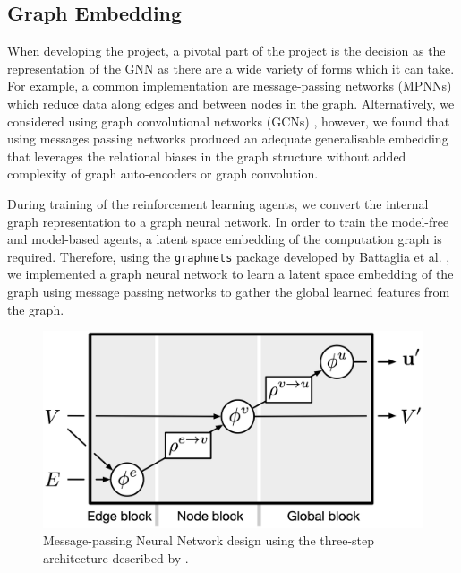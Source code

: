 \subsection{Graph Embedding}
\label{sec:design:subsec:embed}

When developing the project, a pivotal part of the project is the decision as the representation of the GNN as there are a wide variety of forms which it can take. For example, a common implementation are message-passing networks (MPNNs) \cite{gilmer2017neural} which reduce data along edges and between nodes in the graph. Alternatively, we considered using graph convolutional networks (GCNs) \cite{kipf2016semi}, however, we found that using messages passing networks produced an adequate generalisable embedding that leverages the relational biases in the graph structure without added complexity of graph auto-encoders or graph convolution.


During training of the reinforcement learning agents, we convert the internal graph representation to a graph neural network. In order to train the model-free and model-based agents, a latent space embedding of the computation graph is required. Therefore, using the \texttt{graph\textunderscore nets} package developed by Battaglia et al. \cite{battaglia2018relational}, we implemented a graph neural network to learn a latent space embedding of the graph using message passing networks to gather the global learned features from the graph.

\begin{figure}[ht]
  \centering
  \includegraphics[width=0.75\columnwidth]{sections/4rlopt/images/mpnn.png}
  \caption[Message-passing neural network]{Message-passing Neural Network design using the three-step architecture described by \citet{battaglia2018relational}.}
  \label{fig:rlopt:mpgnn}
\end{figure}


